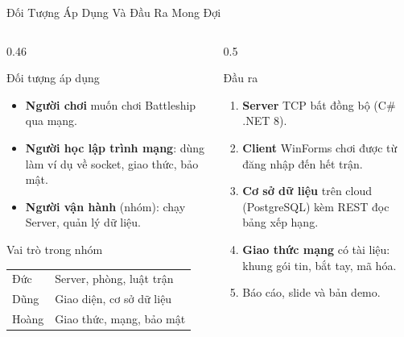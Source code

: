 \begin{frame}{Đối Tượng Áp Dụng Và Đầu Ra Mong Đợi}
  \begin{columns}[T]
    \begin{column}{0.46\textwidth}
      \begin{block}{Đối tượng áp dụng}
        \begin{itemize}
          \item \textbf{Người chơi} muốn chơi Battleship qua mạng.
          \item \textbf{Người học lập trình mạng}: dùng làm ví dụ về socket, giao thức, bảo mật.
          \item \textbf{Người vận hành} (nhóm): chạy Server, quản lý dữ liệu.
        \end{itemize}
      \end{block}
      \begin{exampleblock}{Vai trò trong nhóm}
        \begin{tabular}{@{}ll@{}}
          Đức & Server, phòng, luật trận \\
          Dũng & Giao diện, cơ sở dữ liệu \\
          Hoàng & Giao thức, mạng, bảo mật
        \end{tabular}
      \end{exampleblock}
    \end{column}
    \begin{column}{0.5\textwidth}
      \begin{block}{Đầu ra}
        \begin{enumerate}
          \item \textbf{Server} TCP bất đồng bộ (C\# .NET 8).
          \item \textbf{Client} WinForms chơi được từ đăng nhập đến hết trận.
          \item \textbf{Cơ sở dữ liệu} trên cloud (PostgreSQL) kèm REST đọc bảng xếp hạng.
          \item \textbf{Giao thức mạng} có tài liệu: khung gói tin, bắt tay, mã hóa.
          \item Báo cáo, slide và bản demo.
        \end{enumerate}
      \end{block}
    \end{column}
  \end{columns}
\end{frame}

